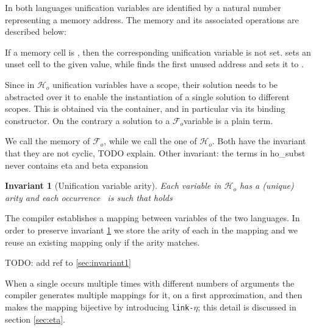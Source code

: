 \documentclass[sigconf,natbib=false,review]{acmart}
\newcommand{\linketa}{\texttt{link-}\ensuremath{\eta}\xspace}
\newcommand{\Fo}{\ensuremath{\mathcal{F}_{\!o}\xspace}} %
\newcommand{\Ho}{\ensuremath{\mathcal{H}_o}\xspace}
\begin{document}
In both languages unification variables are identified by a natural number
representing a memory address.
The memory and its associated operations are described below:



\noindent
If a memory cell is , then the corresponding unification variable
is not set.  sets an unset cell to the given value, while
 finds the first unused address and sets it to .

Since in \Ho unification variables have a scope, their solution needs to be
abstracted over it to enable the instantiation of a single
solution to different scopes. This is obtained via the 
container, and in particular via its  binding constructor.
On the contrary a solution to a \Fo variable is a plain term.




\noindent
We call  the memory of \Fo{}, while we call 
the one of \Ho.
Both have the invariant that they are not cyclic, TODO explain.
Other invariant: the terms in ho\_subst never contains eta and beta expansion



\newtheorem{invariant}{Invariant}

\begin{invariant}[Unification variable arity]\label{inv:uvaarity}
Each variable 
in \Ho has a (unique) arity  and each occurrence~
 is such that  holds
\label{invariant:arity}
\end{invariant}

\noindent
The compiler establishes a mapping between variables of the two languages.
In order to preserve invariant \ref{inv:uvaarity} we store the
arity of each  in the mapping and we reuse an existing
mapping only if the arity matches.

TODO: add ref to \cref{sec:invariant1}



\noindent
When a single  occurs multiple times with different numbers
of arguments the compiler generates multiple mappings for it, on a first
approximation, and then makes the mapping bijective by introducing
\linketa; this detail is discussed in section \ref{sec:eta}.
\end{document}
